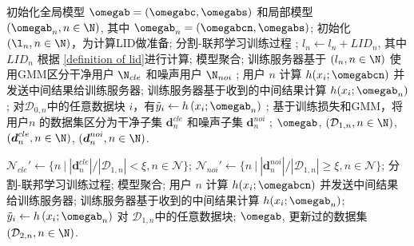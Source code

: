 \begin{algorithm}[H]
\caption{SFLCorr 第一阶段}\label{alg1}
\begin{algorithmic}[1]
\STATE 初始化全局模型 $\omegab=(\omegabc,\omegabs)$ 和局部模型 $(\omegab_n, n\in\N)$, 其中 $\omegab_n = (\omegabcn, \omegabs)$;
\STATE 初始化 $(\l_{n}, n\in\N)$，为计算LID做准备;
\STATE 分割-联邦学习训练过程 ;
\STATE $l_{n}\leftarrow l_{n}+LID_n$, 其中 $LID_n$ 根据 \eqref{definition of lid}进行计算;
\ENDFOR
\STATE 模型聚合;%
\ENDFOR
\STATE 训练服务器基于 $(l_{n},n\in\N)$ 使用GMM区分干净用户 $\N_{cle}$ 和噪声用户 $\N_{noi}$ ;
\STATE 用户 $n$ 计算 $h(x_i;\omegabcn)$ 并发送中间结果给训练服务器;
\STATE 训练服务器基于收到的中间结果计算 $h(x_i;\omegab_n)$ ;
\STATE 对$\mathcal{D}_{0,n}$中的任意数据块 $i$，有$\tilde{y}_i\leftarrow h\left(x_i;\omegab_n \right)$ ;
\ENDFOR
\STATE 基于训练损失和GMM，将用户$n$ 的数据集区分为干净子集 $\boldsymbol{d}_n^{cle}$ 和噪声子集 $\boldsymbol{d}_n^{noi}$ ;
\ENDFOR
\RETURN $\omegab$, $(\mathcal{D}_{1,n}, n\in\N)$, $(\boldsymbol{d}_n^{cle},n\in\N)$, $(\boldsymbol{d}_n^{noi},n\in\N)$.
\end{algorithmic}
\end{algorithm}
\begin{algorithm}[H]
\caption{SFLCorr 第二阶段}\label{alg2}
\begin{algorithmic}[1]
\STATE $\mathcal{N}_{cle}'\leftarrow \{n~|~{|\boldsymbol{d}_n^{cle}|}/{|\mathcal{D}_{1,n}|}<\xi, n\in\mathcal{N}\}$;
\STATE $\mathcal{N}_{noi}'\leftarrow \{n~|~{|\boldsymbol{d}_n^{noi}|}/{|\mathcal{D}_{1,n}|}\geq\xi, n\in\mathcal{N}\}$;
\STATE 分割-联邦学习训练过程; 
\ENDFOR
\STATE 模型聚合;
\ENDFOR
{}
\STATE 用户 $n$ 计算 $h(x_i;\omegabcn)$ 并发送中间结果给训练服务器;
\STATE 训练服务器基于收到的中间结果计算 $h(x_i;\omegab_n)$;
\STATE $\tilde{y}_i\leftarrow h\left(x_i;\omegab_n \right)$ 对 $\mathcal{D}_{1,n}$中的任意数据块;
\ENDFOR
\ENDFOR
\RETURN $\omegab$, 更新过的数据集 $(\mathcal{D}_{2,n},n\in\N)$.
\end{algorithmic}
\end{algorithm}
